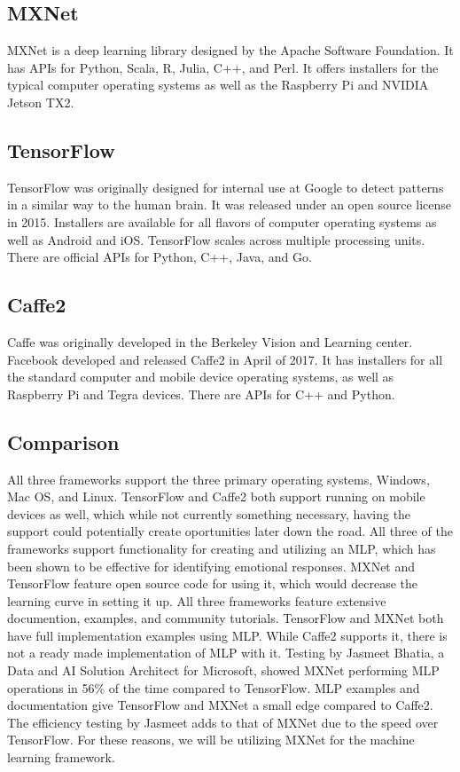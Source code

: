\documentclass[letterpaper,10pt,onecolumn]{IEEEtran}
\begin{document}
  \subsection {MXNet}
    MXNet is a deep learning library designed by the Apache Software Foundation. It has APIs for Python, Scala, R, Julia, C++, and Perl. It offers installers for the typical computer operating systems as well as the Raspberry Pi and NVIDIA Jetson TX2. \cite{mxnet}
  \subsection {TensorFlow}
    TensorFlow was originally designed for internal use at Google to detect patterns in a similar way to the human brain. It was released under an open source license in 2015. \cite{mapr-tensor} Installers are available for all flavors of computer operating systems as well as Android and iOS. TensorFlow scales across multiple processing units. There are official APIs for Python, C++, Java, and Go. \cite{tensor-lang} \cite{friedman_2017}
  \subsection {Caffe2}
	Caffe was originally developed in the Berkeley Vision and Learning center. Facebook developed and released Caffe2 in April of 2017. It has installers for all the standard computer and mobile device operating systems, as well as Raspberry Pi and Tegra devices. There are APIs for C++ and Python.
  \subsection {Comparison}
      All three frameworks support the three primary operating systems, Windows, Mac OS, and Linux. TensorFlow and Caffe2 both support running on mobile devices as well, which while not currently something necessary, having the support could potentially create oportunities later down the road. All three of the frameworks support functionality for creating and utilizing an MLP, which has been shown to be effective for identifying emotional responses. MXNet and TensorFlow feature open source code for using it, which would decrease the learning curve in setting it up. All three frameworks feature extensive documention, examples, and community tutorials. TensorFlow and MXNet both have full implementation examples using MLP. While Caffe2 supports it, there is not a ready made implementation of MLP with it. Testing by Jasmeet Bhatia, a Data and AI Solution Architect for Microsoft, showed MXNet performing MLP operations in 56\% of the time compared to TensorFlow. \cite{nn-tvm} MLP examples and documentation give TensorFlow and MXNet a small edge compared to Caffe2. The efficiency testing by Jasmeet adds to that of MXNet due to the speed over TensorFlow. For these reasons, we will be utilizing MXNet for the machine learning framework.
    \clearpage
    
    
\end{document}
